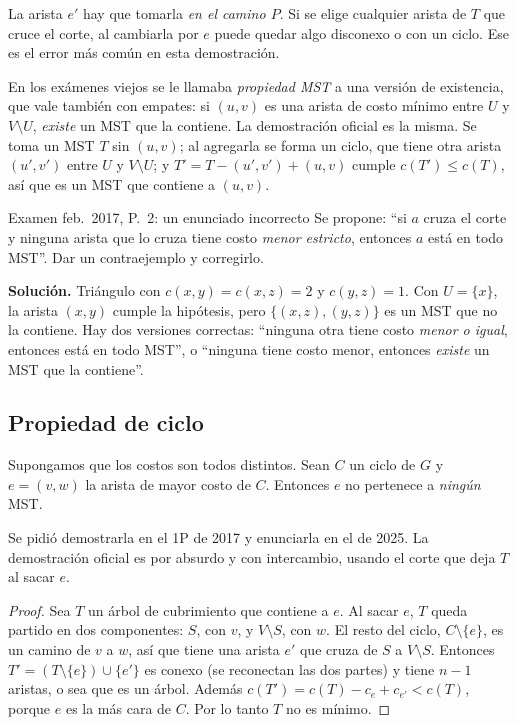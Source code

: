 La arista $e'$ hay que tomarla \emph{en el camino $P$}. Si se elige cualquier arista de $T$ que cruce el corte, al cambiarla por $e$ puede quedar algo disconexo o con un ciclo. Ese es el error más común en esta demostración.

En los exámenes viejos se le llamaba \emph{propiedad MST} a una versión de existencia, que vale también con empates: si $(u,v)$ es una arista de costo mínimo entre $U$ y $V\setminus U$, \emph{existe} un MST que la contiene. La demostración oficial es la misma. Se toma un MST $T$ sin $(u,v)$; al agregarla se forma un ciclo, que tiene otra arista $(u',v')$ entre $U$ y $V\setminus U$; y $T'=T-(u',v')+(u,v)$ cumple $c(T')\le c(T)$, así que es un MST que contiene a $(u,v)$.

\begin{problema}{Examen feb.~2017, P.~2: un enunciado incorrecto}
Se propone: ``si $a$ cruza el corte y ninguna arista que lo cruza tiene costo \emph{menor estricto}, entonces $a$ está en todo MST''. Dar un contraejemplo y corregirlo.

\smallskip
\textbf{Solución.} Triángulo con $c(x,y)=c(x,z)=2$ y $c(y,z)=1$. Con $U=\{x\}$, la arista $(x,y)$ cumple la hipótesis, pero $\{(x,z),(y,z)\}$ es un MST que no la contiene. Hay dos versiones correctas: ``ninguna otra tiene costo \emph{menor o igual}, entonces está en todo MST'', o ``ninguna tiene costo menor, entonces \emph{existe} un MST que la contiene''.
\end{problema}

\subsection{Propiedad de ciclo}

\begin{resultado}
Supongamos que los costos son todos distintos. Sean $C$ un ciclo de $G$ y $e=(v,w)$ la arista de mayor costo de $C$. Entonces $e$ no pertenece a \emph{ningún} MST.
\end{resultado}

Se pidió demostrarla en el 1P de 2017 y enunciarla en el de 2025. La demostración oficial es por absurdo y con intercambio, usando el corte que deja $T$ al sacar $e$.

\begin{proof}
Sea $T$ un árbol de cubrimiento que contiene a $e$. Al sacar $e$, $T$ queda partido en dos componentes: $S$, con $v$, y $V\setminus S$, con $w$. El resto del ciclo, $C\setminus\{e\}$, es un camino de $v$ a $w$, así que tiene una arista $e'$ que cruza de $S$ a $V\setminus S$. Entonces $T'=(T\setminus\{e\})\cup\{e'\}$ es conexo (se reconectan las dos partes) y tiene $n-1$ aristas, o sea que es un árbol. Además $c(T')=c(T)-c_e+c_{e'}<c(T)$, porque $e$ es la más cara de $C$. Por lo tanto $T$ no es mínimo.
\end{proof}

